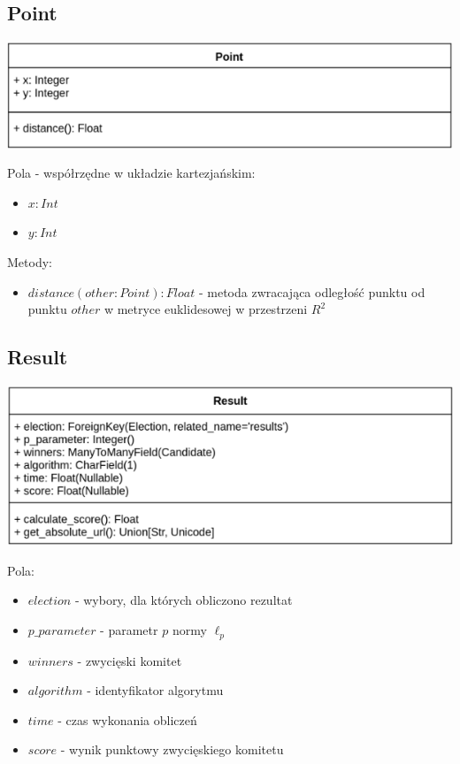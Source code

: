 \documentclass[pdflatex,11pt]{../aghdoc_version2}
\begin{document}
\subsection{Point}
\begin{center}
\centerline{\includegraphics[scale=0.85]{pics/Point.png}}
\end{center}
Pola - współrzędne w układzie kartezjańskim:
\begin{itemize}
\item $x: Int$
\item $y: Int$
\end{itemize}
Metody:
\begin{itemize}
\item $distance(other: Point) : Float$ - metoda zwracająca odległość punktu od punktu $other$ w metryce euklidesowej w przestrzeni $R^2$
\end{itemize}

\subsection{Result}
\begin{center}
\centerline{\includegraphics[scale=0.85]{pics/Result.png}}
\end{center}
Pola:
\begin{itemize}
\item $election$ - wybory, dla których obliczono rezultat
\item $p\_parameter$ - parametr $p$ normy $\ell_p$
\item $winners$ - zwycięski komitet
\item $algorithm$ - identyfikator algorytmu
\item $time$ - czas wykonania obliczeń
\item $score$ - wynik punktowy zwycięskiego komitetu
\end{itemize}
\end{document}
